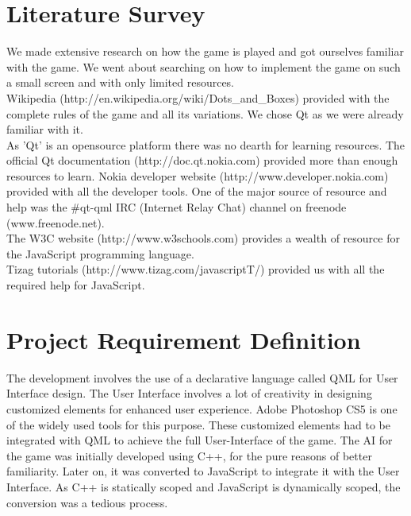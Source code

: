 \documentclass[a4paper,12pt]{article}
\begin{document}
\section{Literature Survey}
\hspace{18pt}We made extensive research on how the game is played and got ourselves familiar with the game. We went about searching on how to implement the game on such a small screen and with only limited resources. \\

Wikipedia (http://en.wikipedia.org/wiki/Dots\_and\_Boxes) provided with the complete rules of the game and all its variations. We chose Qt as we were already familiar with it.\\


As 'Qt' is an opensource platform there was no dearth for learning resources. The official Qt documentation (http://doc.qt.nokia.com) provided more than enough resources to learn. Nokia developer website (http://www.developer.nokia.com) provided with all the developer tools. One of the major source of resource and help was the \#qt-qml IRC (Internet Relay Chat) channel on freenode (www.freenode.net).\\

The W3C website (http://www.w3schools.com) provides a wealth of resource for the JavaScript programming language.\\

Tizag tutorials (http://www.tizag.com/javascriptT/) provided us with all the required help for JavaScript.


\section{Project Requirement Definition}  
\hspace{18pt}The development involves the use of a declarative language called QML for User Interface design. The User Interface involves a lot of creativity in designing customized elements for enhanced user experience. Adobe Photoshop CS5 is one of the widely used tools for this purpose. These customized elements had to be integrated with QML to achieve the full User-Interface of the game. The AI for the game was initially developed using C++, for the pure reasons of better familiarity. Later on, it was converted to JavaScript to integrate it with the User Interface. As C++ is statically scoped and JavaScript is dynamically scoped, the conversion was a tedious process.\\
\end{document}
